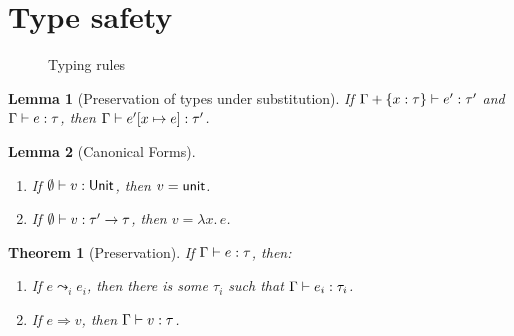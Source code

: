 \documentclass[12pt,a2paper,draft]{article}
\newcommand{\abstr}[2]{\ensuremath{\lambda{#1}.\,{#2}}}
\newcommand{\app}[2]{\ensuremath{{#1}\,{#2}}}
\newcommand{\rec}[2]{\ensuremath{{\normalfont\textsf{rec}}\,{#1}.\,{#2}}}
\newcommand{\unit}{\ensuremath{\normalfont\textsf{unit}}}
\newcommand{\Unit}{\ensuremath{\normalfont\textsf{Unit}}}
\newcommand{\Tj}[3]{\mbox{\ensuremath{{#1}\vdash{#2}:{#3}}}}
\newcommand{\tj}[2]{\Tj{\emptyset}{#1}{#2}}
\newtheorem{lemma}{Lemma}
\newtheorem{theorem}{Theorem}
\begin{document}
\section{Type safety}

\begin{figure}[htb]
  \centering
  \caption{Typing rules}
  \label{figure:Typing_rules}
\end{figure}

\begin{lemma}[Preservation of types under substitution] \label{lemma:Preservation_of_types_under_substitution}
  If $\Tj{\Gamma + \{x:\tau\}}{e'}{\tau'}$ and $\Tj{\Gamma}{e}{\tau}$,
  then $\Tj{\Gamma}{e'[x \mapsto e]}{\tau'}$.
\end{lemma}

\begin{lemma}[Canonical Forms] \label{lemma:Canonical_Forms} \
  \begin{enumerate}
  \item If $\tj{v}{\Unit}$, then $v = \unit$.
  \item If $\tj{v}{\tau' \to \tau}$, then $v = \abstr{x}{e}$.
  \end{enumerate}
\end{lemma}

\begin{theorem}[Preservation] \label{theorem:Preservation}
  If $\Tj{\Gamma}{e}{\tau}$, then:
  \begin{enumerate}
  \item If $e \leadsto_i e_i$, then there is some $\tau_i$ such that $\Tj{\Gamma}{e_i}{\tau_i}$.
  \item If $e \Rightarrow v$, then $\Tj{\Gamma}{v}{\tau}$.
  \end{enumerate}
\end{theorem}
\end{document}
